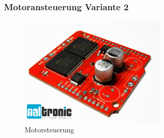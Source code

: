 \subsubsection{Motoransteuerung Variante 2}
\begin{figure}[H] 
\begin{center}

\includegraphics[width=7cm]{Bilder/Bauteile/Motorsteuerung}
\caption{Motorsteuerung}
\label{Motoransteuerung}

\end{center}
\end{figure}
